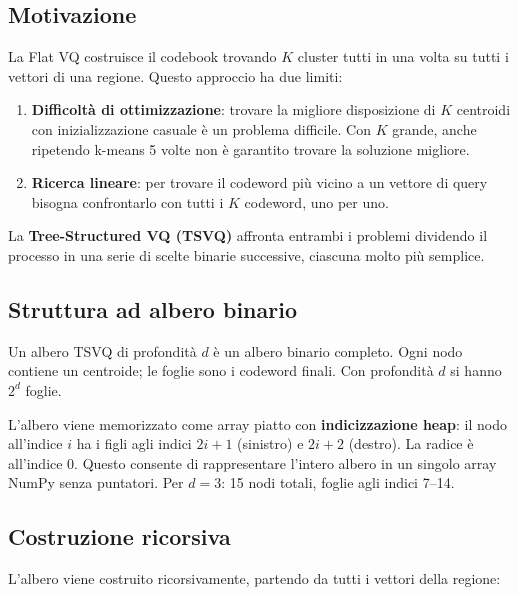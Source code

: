 \documentclass[12pt, a4paper]{article}
\begin{document}
\subsection{Motivazione}

La Flat VQ costruisce il codebook trovando $K$ cluster tutti in una volta su tutti i vettori
di una regione. Questo approccio ha due limiti:
\begin{enumerate}
    \item \textbf{Difficoltà di ottimizzazione}: trovare la migliore disposizione di $K$
          centroidi con inizializzazione casuale è un problema difficile. Con $K$ grande,
          anche ripetendo k-means 5 volte non è garantito trovare la soluzione migliore.
    \item \textbf{Ricerca lineare}: per trovare il codeword più vicino a un vettore di query
          bisogna confrontarlo con tutti i $K$ codeword, uno per uno.
\end{enumerate}
La \textbf{Tree-Structured VQ (TSVQ)} affronta entrambi i problemi dividendo il processo
in una serie di scelte binarie successive, ciascuna molto più semplice.

\subsection{Struttura ad albero binario}

Un albero TSVQ di profondità $d$ è un albero binario completo. Ogni nodo contiene un
centroide; le foglie sono i codeword finali. Con profondità $d$ si hanno $2^d$ foglie.

L'albero viene memorizzato come array piatto con \textbf{indicizzazione heap}: il nodo
all'indice $i$ ha i figli agli indici $2i+1$ (sinistro) e $2i+2$ (destro). La radice è
all'indice 0. Questo consente di rappresentare l'intero albero in un singolo array NumPy
senza puntatori. Per $d=3$: 15 nodi totali, foglie agli indici 7--14.

\subsection{Costruzione ricorsiva}

L'albero viene costruito ricorsivamente, partendo da tutti i vettori della regione:
\end{document}
